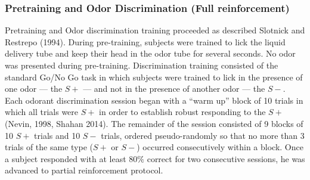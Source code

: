 \subsubsection*{Pretraining and Odor Discrimination (Full reinforcement)}
\label{sec:methods_pretraining}
Pretraining and Odor discrimination training proceeded as described Slotnick and Restrepo (1994). 
During pre-training, subjects were trained to lick the liquid delivery tube and keep their head in the odor tube for several seconds. No odor was presented during pre-training.
Discrimination training consisted of the standard Go/No Go task in which subjects were trained to lick in the presence of one odor --- the $S+$ --- and not in the presence of another odor --- the $S-$.  
Each odorant discrimination session began with a ``warm up'' block of 10 trials in which all trials were $S+$ in order to establish robust responding to the $S+$  (Nevin, 1998, Shahan 2014).  
The remainder of the session consisted of 9 blocks of 10 $S+$ trials and 10 $S-$ trials, ordered pseudo-randomly so that no more than 3 trials of the same type ($S+$ or $S-$) occurred consecutively within a block. 
Once a subject responded with at least $80\%$ correct for two consecutive sessions, he was advanced to partial reinforcement protocol.
  
  